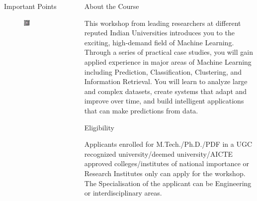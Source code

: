 \documentclass[final]{beamer}
\newlength{\sepwidth}
\newlength{\colwidth}
\newcommand{\separatorcolumn}{\begin{column}{\sepwidth}\end{column}}
\begin{document}
\begin{frame}[t]
\begin{columns}[t]
\begin{column}{\colwidth}
\begin{alertblock}{Important Points}
\begin{itemize}
 \begin{figure}[h]
    \centering
    \includegraphics[width = 0.3\textwidth]{logos/paperQR.png}
    \label{fig:my_zero}
\end{figure}
 
 \\ \newline



    \end{itemize}




  \end{alertblock}

\end{column}

\separatorcolumn

\begin{column}{\colwidth}
  \begin{block}{About the Course}
  

This workshop from leading researchers at different reputed Indian Universities introduces you to the exciting, high-demand field of Machine Learning. Through a series of practical case studies, you will gain applied experience in major areas of Machine Learning including Prediction, Classification, Clustering, and Information Retrieval. You will learn to analyze large and complex datasets, create systems that adapt and improve over time, and build intelligent applications that can make predictions from data.


  \end{block}

  \begin{block}{Eligibility}
  
 Applicants enrolled for M.Tech./Ph.D./PDF in a UGC recognized university/deemed university/AICTE approved colleges/institutes of national importance or Research Institutes only can apply for the workshop. The Specialisation of the applicant can be Engineering or interdisciplinary areas.

  \end{block}
  


\end{column}
\end{columns}
\end{frame}
\end{document}
